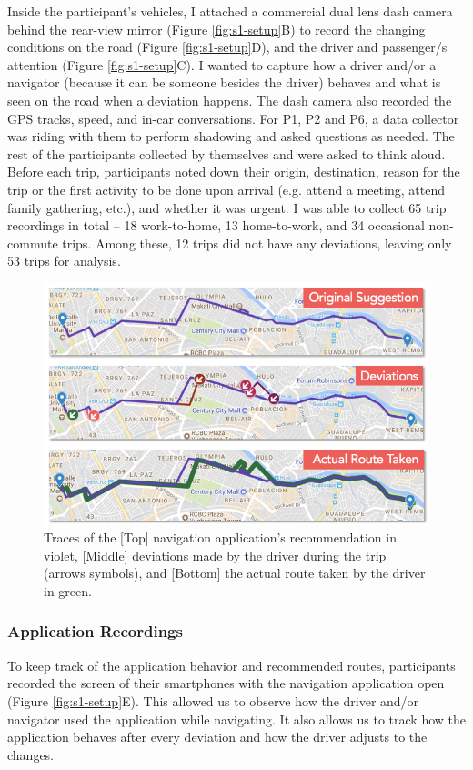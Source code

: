 Inside the participant's vehicles, I attached a commercial dual lens dash camera behind the rear-view mirror (Figure \ref{fig:s1-setup}B) to record the changing conditions on the road (Figure \ref{fig:s1-setup}D), and the driver and passenger/s attention (Figure \ref{fig:s1-setup}C). I wanted to capture how a driver and/or a navigator (because it can be someone besides the driver) behaves and what is seen on the road when a deviation happens. The dash camera also recorded the GPS tracks, speed, and in-car conversations. For P1, P2 and P6, a data collector was riding with them to perform shadowing and asked questions as needed. The rest of the participants collected by themselves and were asked to think aloud. Before each trip, participants noted down their origin, destination, reason for the trip or the first activity to be done upon arrival (e.g. attend a meeting, attend family gathering, etc.), and whether it was urgent. I was able to collect 65 trip recordings in total -- 18 work-to-home, 13 home-to-work, and 34 occasional non-commute trips. Among these, 12 trips did not have any deviations, leaving only 53 trips for analysis. 

\begin{figure}[t]
  \centering
  \includegraphics{figures/s1-map-tracing.png}
  \caption{Traces of the [Top] navigation application's recommendation in violet, [Middle] deviations made by the driver during the trip (arrows symbols), and [Bottom] the actual route taken by the driver in green.}
  \label{fig:s1-map-trace}
\end{figure}

\subsubsection{Application Recordings}
To keep track of the application behavior and recommended routes, participants recorded the screen of their smartphones with the navigation application open (Figure \ref{fig:s1-setup}E). This allowed us to observe how the driver and/or navigator used the application while navigating. It also allows us to track how the application behaves after every deviation and how the driver adjusts to the changes.

